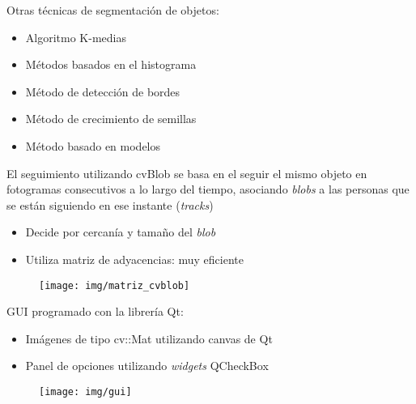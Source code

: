 \documentclass[notes,slidesec,a4]{seminar}
\begin{document}

\begin{hslide}
Otras técnicas de segmentación de objetos:
\begin{itemize}
\item Algoritmo K-medias
\item Métodos basados en el histograma
\item Método de detección de bordes
\item Método de crecimiento de semillas
\item Método basado en modelos
\end{itemize}
\end{hslide}


\begin{hslide}
El seguimiento utilizando cvBlob se basa en el seguir el mismo objeto en fotogramas consecutivos a lo largo del tiempo, asociando \textit{blobs} a las personas que se están siguiendo en ese instante (\textit{tracks})
\begin{itemize}
\item Decide por cercanía y tamaño del \textit{blob}
\item Utiliza matriz de adyacencias: muy eficiente
\end{itemize}
\begin{figure}
\begin{center}
	\texttt{[image: img/matriz\_cvblob]}
\end{center}
\end{figure}
\end{hslide}


\begin{hslide}
GUI programado con la librería Qt:
\begin{itemize}
\item Imágenes de tipo cv::Mat utilizando canvas de Qt
\item Panel de opciones utilizando \textit{widgets} QCheckBox
\end{itemize}
\begin{figure}
\begin{center}
	\texttt{[image: img/gui]}
\end{center}
\end{figure}
\end{hslide}
\end{document}
